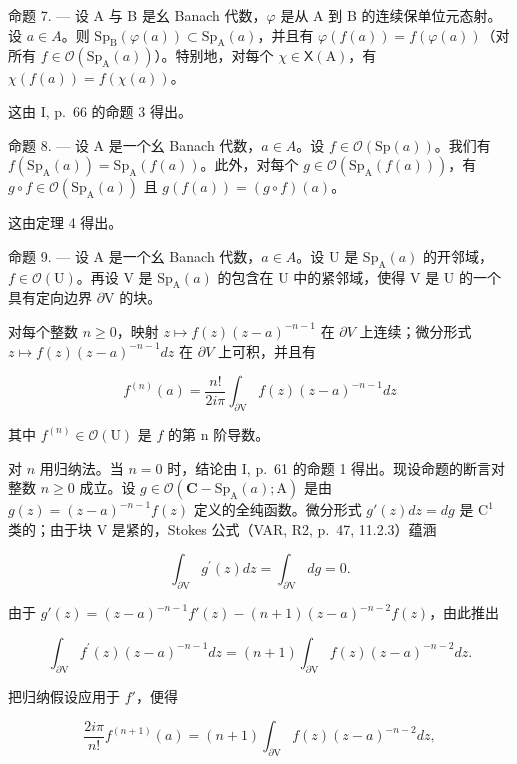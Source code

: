 命题 7. --- 设 A 与 B 是幺 Banach 代数，\(\varphi\) 是从 A 到 B 的连续保单位元态射。设 \(a \in A\)。则 \(\mathrm{Sp}_{\mathrm{B}}(\varphi(a)) \subset \mathrm{Sp}_{\mathrm{A}}(a)\)，并且有 \(\varphi(f(a)) = f(\varphi(a))\)（对所有 \(f \in \mathcal{O}(\mathrm{Sp}_{\mathrm{A}}(a))\)）。特别地，对每个 \(\chi \in \mathsf{X}(\mathrm{A})\)，有 \(\chi(f(a)) = f(\chi(a))\)。

这由 I, p.~66 的命题 3 得出。

命题 8. --- 设 A 是一个幺 Banach 代数，\(a \in A\)。设 \(f \in \mathcal{O}(\mathrm{Sp}(a))\)。我们有 \(f(\mathrm{Sp}_{\mathrm{A}}(a)) = \mathrm{Sp}_{\mathrm{A}}(f(a))\)。此外，对每个 \(g \in \mathcal{O}(\mathrm{Sp}_{\mathrm{A}}(f(a)))\)，有 \(g \circ f \in \mathcal{O}(\mathrm{Sp}_{\mathrm{A}}(a))\) 且 \(g(f(a)) = (g \circ f)(a)\)。

这由定理 4 得出。

命题 9. --- 设 A 是一个幺 Banach 代数，\(a \in A\)。设 U 是 \(\mathrm{Sp}_{\mathrm{A}}(a)\) 的开邻域，\(f \in \mathcal{O}(\mathrm{U})\)。再设 V 是 \(\mathrm{Sp}_{\mathrm{A}}(a)\) 的包含在 U 中的紧邻域，使得 V 是 U 的一个具有定向边界 \(\partial\mathrm{V}\) 的块。

对每个整数 \(n \geqslant 0\)，映射 \(z \mapsto f(z)(z - a)^{-n-1}\) 在 \(\partial V\) 上连续；微分形式 \(z \mapsto f(z)(z - a)^{-n-1} dz\) 在 \(\partial V\) 上可积，并且有

\[
f ^ {(n)} (a) = \frac {n !}{2 i \pi} \int_ {\partial \mathrm{V}} f (z) (z - a) ^ {- n - 1} d z\tag{7}
\]

其中 \(f^{(n)}\in\mathcal{O}(\mathrm{U})\) 是 \(f\) 的第 n 阶导数。

对 \(n\) 用归纳法。当 \(n = 0\) 时，结论由 I, p.~61 的命题 1 得出。现设命题的断言对整数 \(n \geqslant 0\) 成立。设 \(g \in \mathcal{O}(\mathbf{C} - \mathrm{Sp}_{\mathrm{A}}(a); \mathrm{A})\) 是由 \(g(z) = (z - a)^{-n-1} f(z)\) 定义的全纯函数。微分形式 \(g'(z) dz = dg\) 是 \(\mathrm{C}^1\) 类的；由于块 V 是紧的，Stokes 公式（VAR, R2, p.~47, 11.2.3）蕴涵

\[
\int_ {\partial \mathrm{V}} g ^ {\prime} (z) d z = \int_ {\partial \mathrm{V}} d g = 0.
\]

由于 \(g'(z) = (z - a)^{-n-1} f'(z) - (n+1)(z - a)^{-n-2} f(z)\)，由此推出

\[
\int_ {\partial \mathrm{V}} f ^ {\prime} (z) (z - a) ^ {- n - 1} d z = (n + 1) \int_ {\partial \mathrm{V}} f (z) (z - a) ^ {- n - 2} d z.
\]

把归纳假设应用于 \(f'\)，便得

\[
\frac {2 i \pi}{n !} f ^ {(n + 1)} (a) = (n + 1) \int_ {\partial \mathrm{V}} f (z) (z - a) ^ {- n - 2} d z,
\]

